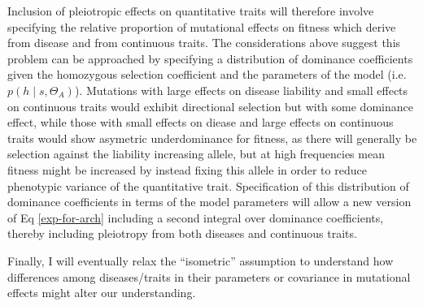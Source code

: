 \documentclass[11pt]{article}
\begin{document}
Inclusion of pleiotropic effects on quantitative traits will therefore involve specifying the relative proportion of mutational effects on fitness which derive from disease and from continuous traits. The considerations above suggest this problem can be approached by specifying a distribution of dominance coefficients given the homozygous selection coefficient and the parameters of the model (i.e. $p\left(h \mid s , \Theta_A\right)$). Mutations with large effects on disease liability and small effects on continuous traits would exhibit directional selection but with some dominance effect, while those with small effects on diease and large effects on continuous traits would show asymetric underdominance for fitness, as there will generally be selection against the liability increasing allele, but at high frequencies mean fitness might be increased by instead fixing this allele in order to reduce phenotypic variance of the quantitative trait. Specification of this distribution of dominance coefficients in terms of the model parameters will allow a new version of Eq \eqref{exp-for-arch} including a second integral over dominance coefficients, thereby including pleiotropy from both diseases and continuous traits.

Finally, I will eventually relax the ``isometric'' assumption to understand how differences among diseases/traits in their parameters or covariance in mutational effects might alter our understanding.  



\end{document}
